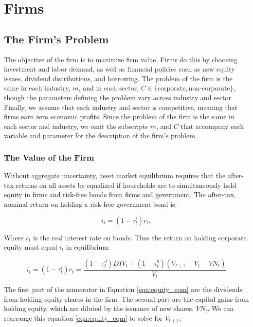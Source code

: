 \chapter{Firms}
%



\section{The Firm's Problem}

The objective of the firm is to maximize firm value.  Firms do this by choosing investment and labor demand, as well as financial policies such as new equity issues, dividend distributions, and borrowing.  The problem of the firm is the same in each industry, $m$, and in each sector, $C\in\{\text{corporate},\text{non-corporate}\}$, though the parameters defining the problem vary across industry and sector.  Finally, we assume that each industry and sector is competitive, meaning that firms earn zero economic profits.  Since the problem of the firm is the same in each sector and industry, we omit the subscripts $m$, and $C$ that accompany each variable and parameter for the description of the firm's problem.

\subsection{The Value of the Firm}

Without aggregate uncertainty, asset market equilibrium requires that the after-tax returns on all assets be equalized if households are to simultaneously hold equity in firms and risk-free bonds from firms and government.  The after-tax, nominal return on holding a risk-free government bond is:

\begin{equation}
\label{eqn:r}
i_{t}=(1-\tau^{i}_{t})r_{t},
\end{equation}

\noindent\noindent Where $r_{t}$ is the real interest rate on bonds.  Thus the return on holding corporate equity must equal $i_{t}$ in equilibrium:

\begin{equation}
\label{eqn:equity_eqm}
i_{t}=(1-\tau^{i}_{t})r_{t}=\frac{(1-\tau^{d}_{t})DIV_{t}+(1-\tau^{g}_{t})(V_{t+1}-V_{t}-VN_{t})}{V_{t}}
\end{equation}

The first part of the numerator in Equation \ref{eqn:equity_eqm} are the dividends from holding equity shares in the firm.  The second part are the capital gains from holding equity, which are diluted by the issuance of new shares, $VN_{t}$.  We can rearrange this equation \ref{eqn:equity_eqm} to solve for $V_{t+1}$:

